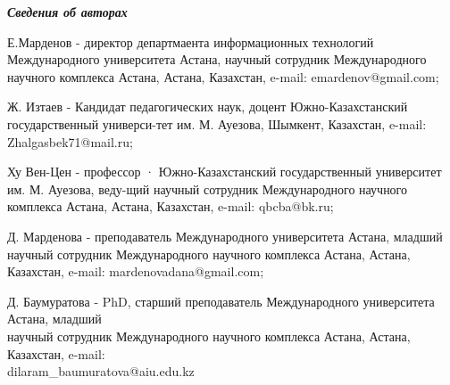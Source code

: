 \emph{{\bfseries Сведения об авторах}}
\begin{noparindent}

Е.Марденов - директор департмаента информационных технологий
Международного университета Астана, научный сотрудник Международного
научного комплекса Астана, Астана, Казахстан, e-mail:
emardenov@gmail.com;

Ж. Изтаев - Кандидат педагогических наук, доцент Южно-Казахстанский
государственный универси-тет им. М. Ауезова, Шымкент, Казахстан, e-mail:
Zhalgasbek71@mail.ru;

Ху Вен-Цен - профессор · Южно-Казахстанский государственный университет
им. М. Ауезова, веду-щий научный сотрудник Международного научного
комплекса Астана, Астана, Казахстан, e-mail: qbcba@bk.ru;

Д. Марденова - преподаватель Международного университета Астана, младший
научный сотрудник Международного научного комплекса Астана, Астана,
Казахстан, e-mail: mardenovadana@gmail.com;

Д. Баумуратова - PhD, старший преподаватель Международного университета
Астана, младший \\научный сотрудник Международного научного комплекса
Астана, Астана, Казахстан, e-mail:\\ dilaram\_baumuratova@aiu.edu.kz

\end{noparindent}
